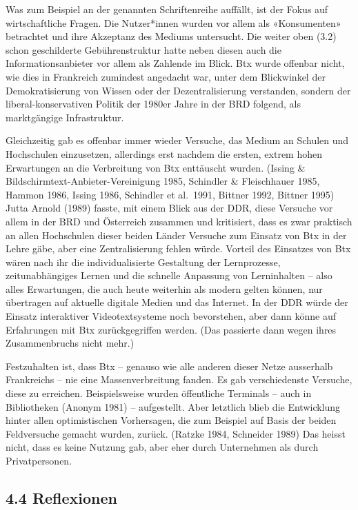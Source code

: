 \documentclass[a4paper,
fontsize=11pt,
oneside,
numbers=noperiodatend,
parskip=half-,
bibliography=totoc,
final
]{scrartcl}
\begin{document}
Was zum Beispiel an der genannten Schriftenreihe auffällt, ist der Fokus
auf wirtschaftliche Fragen. Die Nutzer*innen wurden vor allem als
«Konsumenten» betrachtet und ihre Akzeptanz des Mediums untersucht. Die
weiter oben (3.2) schon geschilderte Gebührenstruktur hatte neben diesen
auch die Informationsanbieter vor allem als Zahlende im Blick. Btx wurde
offenbar nicht, wie dies in Frankreich zumindest angedacht war, unter
dem Blickwinkel der Demokratisierung von Wissen oder der
Dezentralisierung verstanden, sondern der liberal-konservativen Politik
der 1980er Jahre in der BRD folgend, als marktgängige Infrastruktur.

Gleichzeitig gab es offenbar immer wieder Versuche, das Medium an
Schulen und Hochschulen einzusetzen, allerdings erst nachdem die ersten,
extrem hohen Erwartungen an die Verbreitung von Btx enttäuscht wurden.
(Issing \& Bildschirmtext-Anbieter-Vereinigung 1985, Schindler \&
Fleischhauer 1985, Hammon 1986, Issing 1986, Schindler et al.~1991,
Bittner 1992, Bittner 1995) Jutta Arnold (1989) fasste, mit einem Blick
aus der DDR, diese Versuche vor allem in der BRD und Österreich zusammen
und kritisiert, dass es zwar praktisch an allen Hochschulen dieser
beiden Länder Versuche zum Einsatz von Btx in der Lehre gäbe, aber eine
Zentralisierung fehlen würde. Vorteil des Einsatzes von Btx wären nach
ihr die individualisierte Gestaltung der Lernprozesse, zeitunabhängiges
Lernen und die schnelle Anpassung von Lerninhalten -- also alles
Erwartungen, die auch heute weiterhin als modern gelten können, nur
übertragen auf aktuelle digitale Medien und das Internet. In der DDR
würde der Einsatz interaktiver Videotextsysteme noch bevorstehen, aber
dann könne auf Erfahrungen mit Btx zurückgegriffen werden. (Das
passierte dann wegen ihres Zusammenbruchs nicht mehr.)

Festzuhalten ist, dass Btx -- genauso wie alle anderen dieser Netze
ausserhalb Frankreichs -- nie eine Massenverbreitung fanden. Es gab
verschiedenste Versuche, diese zu erreichen. Beispielsweise wurden
öffentliche Terminals -- auch in Bibliotheken (Anonym 1981) --
aufgestellt. Aber letztlich blieb die Entwicklung hinter allen
optimistischen Vorhersagen, die zum Beispiel auf Basis der beiden
Feldversuche gemacht wurden, zurück. (Ratzke 1984, Schneider 1989) Das
heisst nicht, dass es keine Nutzung gab, aber eher durch Unternehmen als
durch Privatpersonen.

\hypertarget{reflexionen}{%
\subsection{4.4 Reflexionen}\label{reflexionen}}
\end{document}
